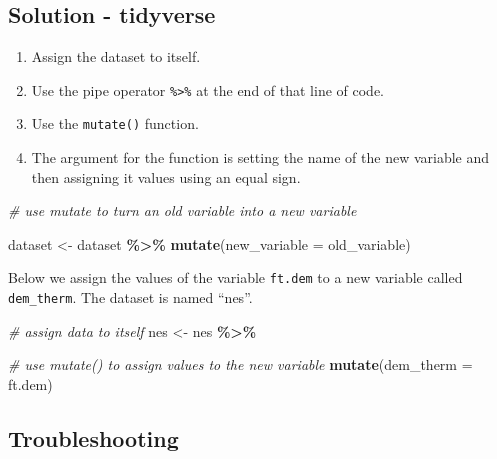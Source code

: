 \documentclass[
]{book}
\newenvironment{Shaded}{\begin{snugshade}}{\end{snugshade}}
\newcommand{\AttributeTok}[1]{\textcolor[rgb]{0.13,0.29,0.53}{#1}}
\newcommand{\CommentTok}[1]{\textcolor[rgb]{0.56,0.35,0.01}{\textit{#1}}}
\newcommand{\FunctionTok}[1]{\textcolor[rgb]{0.13,0.29,0.53}{\textbf{#1}}}
\newcommand{\NormalTok}[1]{#1}
\newcommand{\OtherTok}[1]{\textcolor[rgb]{0.56,0.35,0.01}{#1}}
\newcommand{\SpecialCharTok}[1]{\textcolor[rgb]{0.81,0.36,0.00}{\textbf{#1}}}
\providecommand{\tightlist}{%
  \setlength{\itemsep}{0pt}\setlength{\parskip}{0pt}}
\begin{document}
\hypertarget{solution---tidyverse}{%
\subsection{Solution - tidyverse}\label{solution---tidyverse}}

\begin{enumerate}
\def\labelenumi{\arabic{enumi}.}
\tightlist
\item
  Assign the dataset to itself.
\item
  Use the pipe operator \texttt{\%\textgreater{}\%} at the end of that line of code.
\item
  Use the \texttt{mutate()} function.
\item
  The argument for the function is setting the name of the new variable and then assigning it values using an equal sign.
\end{enumerate}

\begin{Shaded}
\begin{Highlighting}[]
\CommentTok{\# use mutate to turn an old variable into a new variable}

\NormalTok{dataset }\OtherTok{\textless{}{-}}\NormalTok{ dataset }\SpecialCharTok{\%\textgreater{}\%}
  \FunctionTok{mutate}\NormalTok{(}\AttributeTok{new\_variable =}\NormalTok{ old\_variable)}
\end{Highlighting}
\end{Shaded}

Below we assign the values of the variable \texttt{ft.dem} to a new variable called \texttt{dem\_therm}. The dataset is named ``nes''.

\begin{Shaded}
\begin{Highlighting}[]
\CommentTok{\# assign data to itself}
\NormalTok{nes }\OtherTok{\textless{}{-}}\NormalTok{ nes }\SpecialCharTok{\%\textgreater{}\%}
  
  \CommentTok{\# use mutate() to assign values to the new variable}
  \FunctionTok{mutate}\NormalTok{(}\AttributeTok{dem\_therm =}\NormalTok{ ft.dem)}
\end{Highlighting}
\end{Shaded}

\hypertarget{troubleshooting-12}{%
\subsection{Troubleshooting}\label{troubleshooting-12}}
\end{document}
